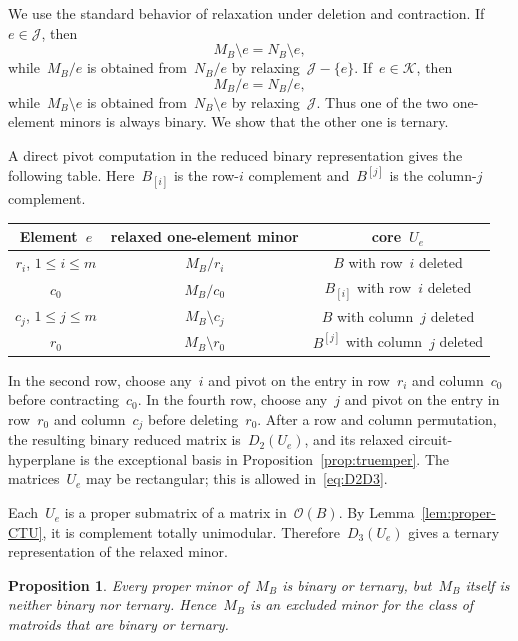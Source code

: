\documentclass{amsart}
\newtheorem{proposition}[theorem]{Proposition}
\numberwithin{equation}{section}
\newcommand{\cO}{\mathcal O}
\newcommand{\cJ}{\mathcal J}
\newcommand{\cK}{\mathcal K}
\begin{document}
We use the standard behavior of relaxation under deletion and contraction.
If~$e\in\cJ$, then
$$
    M_B\setminus e=N_B\setminus e,
$$
while~$M_B/e$ is obtained from~$N_B/e$ by relaxing~$\cJ-\{e\}$.
If~$e\in\cK$, then
$$
    M_B/e=N_B/e,
$$
while~$M_B\setminus e$ is obtained from~$N_B\setminus e$ by relaxing~$\cJ$.
Thus one of the two one-element minors is always binary.
We show that the other one is ternary.

A direct pivot computation in the reduced binary representation gives the following table.
Here~$B_{[i]}$ is the row-$i$ complement and~$B^{[j]}$ is the column-$j$ complement.

\begin{center}
    \renewcommand{\arraystretch}{1.25}
    \begin{tabular}{c c c}
        \toprule
        Element~$e$ & relaxed one-element minor & core~$U_e$\\
        \midrule
        $r_i$, $1\leq i\leq m$ & $M_B/r_i$ & $B$ with row~$i$ deleted\\
        $c_0$ & $M_B/c_0$ & $B_{[i]}$ with row~$i$ deleted\\
        $c_j$, $1\leq j\leq m$ & $M_B\setminus c_j$ & $B$ with column~$j$ deleted\\
        $r_0$ & $M_B\setminus r_0$ & $B^{[j]}$ with column~$j$ deleted\\
        \bottomrule
    \end{tabular}
\end{center}

In the second row, choose any~$i$ and pivot on the entry in row~$r_i$ and column~$c_0$ before contracting~$c_0$.
In the fourth row, choose any~$j$ and pivot on the entry in row~$r_0$ and column~$c_j$ before deleting~$r_0$.
After a row and column permutation, the resulting binary reduced matrix is~$D_2(U_e)$, and its relaxed circuit-hyperplane is the exceptional basis in Proposition~\ref{prop:truemper}.
The matrices~$U_e$ may be rectangular; this is allowed in~\eqref{eq:D2D3}.

Each~$U_e$ is a proper submatrix of a matrix in~$\cO(B)$.
By Lemma~\ref{lem:proper-CTU}, it is complement totally unimodular.
Therefore~$D_3(U_e)$ gives a ternary representation of the relaxed minor.

\begin{proposition}\label{prop:excluded}
    Every proper minor of~$M_B$ is binary or ternary, but~$M_B$ itself is neither binary nor ternary.
    Hence~$M_B$ is an excluded minor for the class of matroids that are binary or ternary.
\end{proposition}
\end{document}
